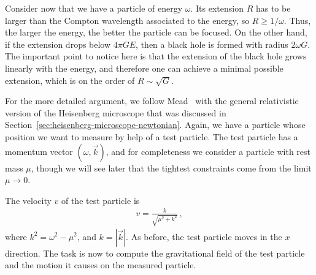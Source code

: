 \documentclass{article}
\def\beqn{\begin{eqnarray}}
\def\eeqn{\end{eqnarray}}
\begin{document}
Consider now that we have a particle of energy $\omega$. Its extension $R$ has to be larger than the Compton
wavelength associated to the energy, so $R \geq 1/\omega$. Thus, the larger the energy,
the better the particle can be focused. On the other hand, if the extension drops
below $4 \pi G E$, then a black hole is formed with radius $2 \omega G$. The important point to notice 
here is that the extension of the black hole grows linearly with the energy, and 
therefore one can achieve a minimal possible
extension, which is on the order of $R\sim \sqrt{G}$. 

For the more detailed argument, we follow Mead~\cite{Mead} with the general relativistic 
version of the Heisenberg microscope that was discussed in Section~\ref{sec:heisenberg-microscope-newtonian}. Again, we
have a particle whose position we want to measure by help of a test particle. The
test particle has a momentum vector $(\omega, \vec k)$, and for completeness we consider a 
particle with rest mass $\mu$, though we will see later that the tightest constraints
come from the limit $\mu \to 0$. 

The velocity $v$ of the test particle is
\beqn
v = \frac{k}{\sqrt{\mu^2 + k^2}}\,, 
\eeqn
where $k^2 = \omega^2 - \mu^2$, and $k=|\vec k|$. As before, the test particle moves in the $x$ direction. 
The task is now to compute the gravitational field of the test particle and the motion
it causes on the measured particle.
\end{document}
